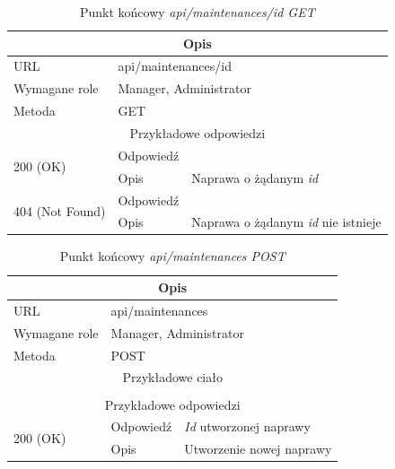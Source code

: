 \documentclass[eng,printmode,openany]{mgr}
\begin{document}
\begin{table}[H]
	\caption{Punkt końcowy \textit{api/maintenances/id GET}}
	\begin{tabularx}{\textwidth}{|l|l|X|}
		\hline
		\multicolumn{3}{|c|}{Opis}                         						\\ \hline
		URL                       & \multicolumn{2}{l|}{api/maintenances/id} 	\\ \hline
		Wymagane role             & \multicolumn{2}{l|}{Manager, Administrator}               \\ \hline
		Metoda                    & \multicolumn{2}{l|}{GET} 					\\ \hline
		\multicolumn{3}{|c|}{ Przykładowe odpowiedzi}                   		\\ \hline
		\multirow{2}{*}{200 (OK)} 			& Odpowiedź    	&        \\ \cline{2-3} 
		& Opis         	& Naprawa o żądanym \textit{id}      									                    \\ \hline
		\multirow{2}{*}{404 (Not Found)} 	& Odpowiedź     &    \\ \cline{2-3} 
		& Opis          & Naprawa o żądanym \textit{id} nie istnieje      									        \\ \hline
	\end{tabularx}
\end{table}

\begin{table}[H]
	\caption{Punkt końcowy \textit{api/maintenances POST}}
	\begin{tabularx}{\textwidth}{|l|l|X|}
		\hline
		\multicolumn{3}{|c|}{Opis}                         						\\ \hline
		URL                       & \multicolumn{2}{l|}{api/maintenances} 	    \\ \hline
		Wymagane role             & \multicolumn{2}{l|}{Manager, Administrator} \\ \hline
		Metoda                    & \multicolumn{2}{l|}{POST} 					\\ \hline
		\multicolumn{3}{|c|}{Przykładowe ciało}         						\\ \hline
		\multicolumn{3}{|c|}{} 		    \\ \hline
		\multicolumn{3}{|c|}{ Przykładowe odpowiedzi}                   		                        \\ \hline
		\multirow{2}{*}{200 (OK)} 			& Odpowiedź     &  \textit{Id} utworzonej naprawy           \\ \cline{2-3} 
		& Opis         	& Utworzenie nowej naprawy     						    \\ \hline
	\end{tabularx}
\end{table}
\end{document}
